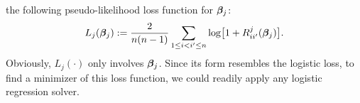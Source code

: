 \documentclass[twoside,11pt]{article}
\newcommand{\defeq}{\vcentcolon=}
\newcommand*{\BR}{\mathbb{R}}
\newcommand*{\grad} {\nabla L(\bbeta)}
\newcommand*{\hess}{\nabla^2  L(\bbeta)}
\newcommand*{\sbbeta}{\bbeta_{j}}
\begin{document}
 the following  pseudo-likelihood loss function for $\bm{\beta}_j$:
\begin{align}\label{equ::NodewiseLoss}
L_j(\bm{\beta}_j) := \frac{2}{n(n-1)} \sum\limits_{1 \leq i<i'\leq n}\log \bigl[1  + R_{ii'}^j(\bm{\beta}_j) \bigr].
\end{align}
Obviously,  ${L_j}(\cdot)$ only involves $\bm{\beta}_j$. Since
  its form resembles the logistic loss, to find a minimizer of this loss function, we could readily apply any logistic regression solver.

 
\end{document}
